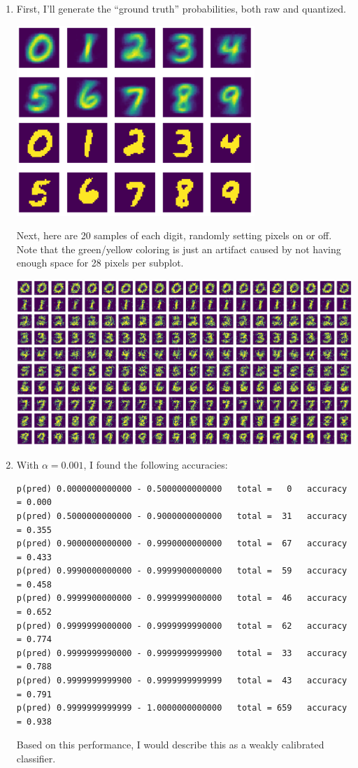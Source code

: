 \documentclass{article}
\begin{document}
\begin{enumerate}[start=1]
\newpage

\item %
    First, I'll generate the ``ground truth'' probabilities, both raw and quantized.
    
    \begin{center}
    \includegraphics[width=9cm]{10.1.png}
    \end{center}
    
    Next, here are 20 samples of each digit, randomly setting pixels on or off. Note that the green/yellow coloring is just an artifact caused by not having enough space for 28 pixels per subplot.
    
    \begin{center}
    \includegraphics[width=\linewidth]{10.2.png}
    \end{center}
    
\item %
    With $\alpha = 0.001$, I found the following accuracies:
    
    \begin{Verbatim}
p(pred) 0.0000000000000 - 0.5000000000000   total =   0   accuracy = 0.000
p(pred) 0.5000000000000 - 0.9000000000000   total =  31   accuracy = 0.355
p(pred) 0.9000000000000 - 0.9990000000000   total =  67   accuracy = 0.433
p(pred) 0.9990000000000 - 0.9999900000000   total =  59   accuracy = 0.458
p(pred) 0.9999900000000 - 0.9999999000000   total =  46   accuracy = 0.652
p(pred) 0.9999999000000 - 0.9999999990000   total =  62   accuracy = 0.774
p(pred) 0.9999999990000 - 0.9999999999900   total =  33   accuracy = 0.788
p(pred) 0.9999999999900 - 0.9999999999999   total =  43   accuracy = 0.791
p(pred) 0.9999999999999 - 1.0000000000000   total = 659   accuracy = 0.938
    \end{Verbatim}

    Based on this performance, I would describe this as a weakly calibrated classifier.

\end{enumerate}
\end{document}
